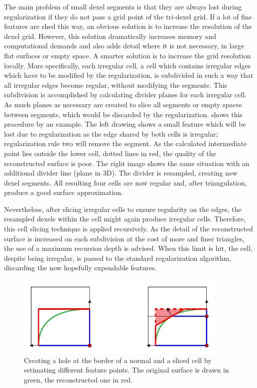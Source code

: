 The main problem of small dexel segments is that they are always lost during regularization if they do not pass a grid point of the tri-dexel grid.
If a lot of fine features are shed this way, an obvious solution is to increase the resolution of the dexel grid.
However, this solution dramatically increases memory and computational demands and also adds detail where it is not necessary, \eg in large flat surfaces or empty space.
A smarter solution is to increase the grid resolution locally.
More specifically, each irregular cell, \ie a cell which contains irregular edges which have to be modified by the regularization, is subdivided in such a way that all irregular edges become regular, without modifying the segments.
This subdivision is accomplished by calculating divider planes for each irregular cell.
As much planes as necessary are created to slice all segments or empty spaces between segments, which would be discarded by the regularization.
 shows this procedure by an example.
The left drawing shows a small feature which will be lost due to regularization as the edge shared by both cells is irregular; regularization rule two will remove the segment.
As the calculated intermediate point lies outside the lower cell, \cf dotted lines in red, the quality of the reconstructed surface is poor.
The right image shows the same situation with an additional divider line (plane in 3D).
The divider is resampled, creating new dexel segments.
All resulting four cells are now regular and, after triangulation, produce a good surface approximation.

Nevertheless, after slicing irregular cells to ensure regularity on the edges, the resampled dexels within the cell might again produce irregular cells.
Therefore, this cell slicing technique is applied recursively.
As the detail of the reconstructed surface is increased on each subdivision at the cost of more and finer triangles, the use of a maximum recursion depth is advised.
When this limit is hit, the cell, despite being irregular, is passed to the standard regularization algorithm, discarding the now hopefully expendable features.

\begin{figure}
	\centering
	\includegraphics[width=0.9\textwidth]{images/tri_dexel_hole_creation}
	\caption{
		Creating a hole at the border of a normal and a sliced cell by estimating different feature points.
		The original surface is drawn in green, the reconstructed one in red.
	}
	\label{fig:tri_dexel_hole_creation}
\end{figure}

